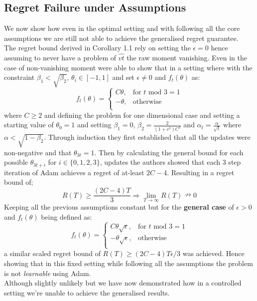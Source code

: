 \documentclass[nohyperref]{article}
\theoremstyle{plain}
\theoremstyle{definition}
\theoremstyle{remark}
\begin{document}
\subsection{Regret Failure under Assumptions}
We now show how even in the optimal setting and with following all the core assumptions we are still not able to achieve the generalised regret guarantee.\\
The regret bound derived in Corollary 1.1 \cite{Kingma14} rely on setting the $\epsilon = 0$ hence assuming to never have a problem of $\hat{vt}$ the raw moment vanishing. 
Even in the case of non-vanishing moment \cite{Reddi19} were able to show that in a setting where with the constraint $\beta_{1} < \sqrt{\beta_{2}}$, $\theta_{i} \in [-1, 1]$ and set $\epsilon \neq 0$ and $f_{t}(\theta)$ as:
$$f_{t}(\theta) = 
\begin{cases}
            C \theta,      & \text{for $t$ mod 3} = 1  \\
            - \theta,      & \text{otherwise}\\
\end{cases}
$$
where $C \geq 2 $ and defining the problem for one dimensional case and setting a starting value of $\theta_{0} = 1$ and setting $\beta_{1} =0$, $\beta_{2} = \frac{2}{(1+c^2)C^2}$ and $\alpha_{t} = \frac{\alpha}{\sqrt{t}}$ where $\alpha < \sqrt{1-\beta_{2}}$. Through induction they first established that all the updates were non-negative and that $\theta_{3t} = 1$. Then by calculating the general bound for each possible $\theta_{3t + i}$ for $i \in \{0,1,2,3\}$, updates the authors showed that each 3 step iteration of Adam achieves a regret of at-least $2C - 4$. Resulting in a regret bound of;
$$R(T) \geq \frac{(2C -4)T}{3} \Longrightarrow \lim_{T \rightarrow \infty} R(T) \nrightarrow 0 $$
Keeping all the previous assumptions constant but for the \textbf{general case} of $\epsilon > 0$ and $f_t({\theta})$ being defined as:$$f_{t}(\theta) = 
\begin{cases}
            C \theta \sqrt{\epsilon},      & \text{for $t$ mod 3} = 1  \\
            - \theta \sqrt{\epsilon},      & \text{otherwise}\\
\end{cases}
$$
a similar scaled regret bound of $R(T) \geq (2C -4)T\epsilon/3$ was achieved.
Hence showing that in this fixed setting while following all the assumptions the problem is not \textit{learnable} using Adam. \\
Although slightly unlikely but we have now demonstrated how in a controlled setting we're unable to achieve the generalised results.
\end{document}

